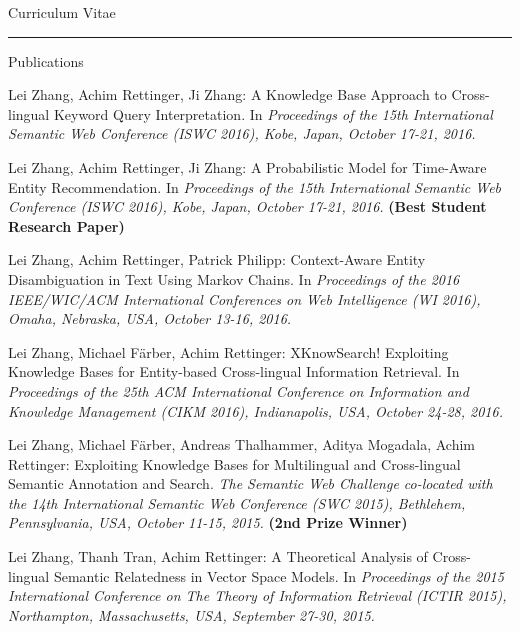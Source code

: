 \begin{cv}{\centerline{\LARGE Curriculum Vitae}}
  \hrule

  \setlength{\cvlabelwidth}{0mm}
  \begin{cvlist}{Publications}
  \item[] 
    \begin{list}{}{\leftmargin=-1em}
    \item  Lei Zhang, Achim Rettinger, Ji Zhang: A Knowledge Base Approach to Cross-lingual Keyword Query Interpretation. In \emph{Proceedings of the 15th International Semantic Web Conference (ISWC 2016), Kobe, Japan, October 17-21, 2016.}
    
    \item Lei Zhang, Achim Rettinger, Ji Zhang: A Probabilistic Model for Time-Aware Entity Recommendation. In \emph{Proceedings of the 15th International Semantic Web Conference (ISWC 2016), Kobe, Japan, October 17-21, 2016.}
    \textbf{(Best Student Research Paper)}
    
    \item Lei Zhang, Achim Rettinger, Patrick Philipp: Context-Aware Entity Disambiguation in Text Using Markov Chains. In \emph{Proceedings of the 2016 IEEE/WIC/ACM International Conferences on Web Intelligence (WI 2016), Omaha, Nebraska, USA, October 13-16, 2016.}
    
    \item Lei Zhang, Michael Färber, Achim Rettinger: XKnowSearch! Exploiting Knowledge Bases for Entity-based Cross-lingual Information Retrieval. In \emph{Proceedings of the 25th ACM International Conference on Information and Knowledge Management (CIKM 2016), Indianapolis, USA, October 24-28, 2016.}
    
    \item Lei Zhang, Michael Färber, Andreas Thalhammer, Aditya Mogadala, Achim Rettinger: Exploiting Knowledge Bases for Multilingual and Cross-lingual Semantic Annotation and Search. \emph{The Semantic Web Challenge co-located with the 14th International Semantic Web Conference (SWC 2015), Bethlehem, Pennsylvania, USA, October 11-15, 2015.}
    \textbf{(2nd Prize Winner)}
    
    \item Lei Zhang, Thanh Tran, Achim Rettinger: A Theoretical Analysis of Cross-lingual Semantic Relatedness in Vector Space Models. In \emph{Proceedings of the 2015 International Conference on The Theory of Information Retrieval (ICTIR 2015), Northampton, Massachusetts, USA, September 27-30, 2015.}
    

\end{list}
\end{cvlist}
\end{cv}
